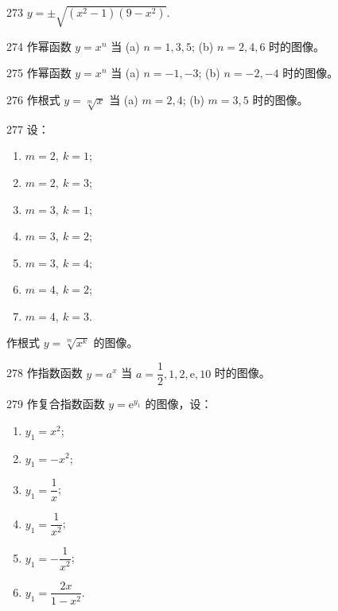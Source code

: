 \begin{prob}[S]{273}
$y = \pm\sqrt{(x^2 - 1)(9 - x^2)}$.
\end{prob}

\begin{prob}[M]{274}
作幂函数 $y = x^n$ 当 (a) $n = 1, 3, 5$; (b) $n = 2, 4, 6$ 时的图像。
\end{prob}

\begin{prob}[M]{275}
作幂函数 $y = x^n$ 当 (a) $n = -1, -3$; (b) $n = -2, -4$ 时的图像。
\end{prob}

\begin{prob}[M]{276}
作根式 $y = \sqrt[m]{x}$ 当 (a) $m = 2, 4$; (b) $m = 3, 5$ 时的图像。
\end{prob}

\begin{prob}[L]{277}
设：
\begin{enumerate}[label=(\alph*), itemsep=2pt, topsep=3pt]
  \item $m = 2,\ k = 1$;
  \item $m = 2,\ k = 3$;
  \item $m = 3,\ k = 1$;
  \item $m = 3,\ k = 2$;
  \item $m = 3,\ k = 4$;
  \item $m = 4,\ k = 2$;
  \item $m = 4,\ k = 3$.
\end{enumerate}
作根式 $y = \sqrt[m]{x^k}$ 的图像。
\end{prob}

\begin{prob}[M]{278}
作指数函数 $y = a^x$ 当 $a = \dfrac{1}{2}, 1, 2, \mathrm{e}, 10$ 时的图像。
\end{prob}

\begin{prob}[L]{279}
作复合指数函数 $y = \mathrm{e}^{y_1}$ 的图像，设：
\begin{enumerate}[label=(\alph*), itemsep=2pt, topsep=3pt]
  \item $y_1 = x^2$;
  \item $y_1 = -x^2$;
  \item $y_1 = \dfrac{1}{x}$;
  \item $y_1 = \dfrac{1}{x^2}$;
  \item $y_1 = -\dfrac{1}{x^2}$;
  \item $y_1 = \dfrac{2x}{1 - x^2}$.
\end{enumerate}
\end{prob}

